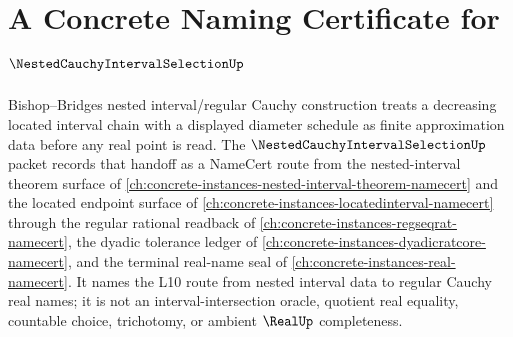 \chapter{A Concrete Naming Certificate for $\NestedCauchyIntervalSelectionUp$}
\label{ch:concrete-instances-nested-cauchy-interval-selection-namecert}

Bishop--Bridges nested interval/regular Cauchy construction treats a decreasing located interval chain with a displayed diameter schedule as finite approximation data before any real point is read. The $\NestedCauchyIntervalSelectionUp$ packet records that handoff as a NameCert route from the nested-interval theorem surface of \autoref{ch:concrete-instances-nested-interval-theorem-namecert} and the located endpoint surface of \autoref{ch:concrete-instances-locatedinterval-namecert} through the regular rational readback of \autoref{ch:concrete-instances-regseqrat-namecert}, the dyadic tolerance ledger of \autoref{ch:concrete-instances-dyadicratcore-namecert}, and the terminal real-name seal of \autoref{ch:concrete-instances-real-namecert}. It names the L10 route from nested interval data to regular Cauchy real names; it is not an interval-intersection oracle, quotient real equality, countable choice, trichotomy, or ambient $\RealUp$ completeness.

